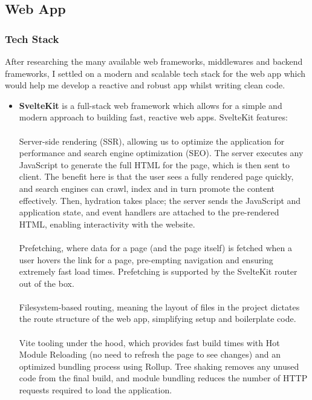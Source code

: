 \documentclass[12pt,a4paper]{article}
\begin{document}
\subsection{Web App}
\subsubsection{Tech Stack}
After researching the many available web frameworks, middlewares and backend frameworks, I settled on a modern and scalable tech stack for the web app which would help me develop a reactive and robust app whilst writing clean code.
\begin{itemize}
    \item \textbf{SvelteKit} is a full-stack web framework which allows for a simple and modern approach to building fast, reactive web apps. SvelteKit features:
    \\\\
    Server-side rendering (SSR), allowing us to optimize the application for performance and search engine optimization (SEO). The server executes any JavaScript to generate the full HTML for the page, which is then sent to client. The benefit here is that the user sees a fully rendered page quickly, and search engines can crawl, index and in turn promote the content effectively. Then, hydration takes place; the server sends the JavaScript and application state, and event handlers are attached to the pre-rendered HTML, enabling interactivity with the website.
    \\\\
    Prefetching, where data for a page (and the page itself) is fetched when a user hovers the link for a page, pre-empting navigation and ensuring extremely fast load times. Prefetching is supported by the SvelteKit router out of the box.
    \\\\
    Filesystem-based routing, meaning the layout of files in the project dictates the route structure of the web app, simplifying setup and boilerplate code.
    \\\\
    Vite tooling under the hood, which provides fast build times with Hot Module Reloading (no need to refresh the page to see changes) and an optimized bundling process using Rollup. Tree shaking removes any unused code from the final build, and module bundling reduces the number of HTTP requests required to load the application.
    \\\\

\end{itemize}
\end{document}
